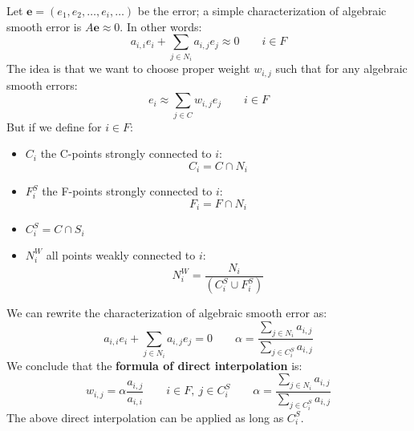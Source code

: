 Let $\mathbf{e} = \left( e_{1}, e_{2}, \dots, e_{i}, \dots \right)$ be the error; a simple characterization of algebraic smooth error is $A\mathbf{e} \approx 0$. In other words:
\begin{equation}
	a_{i,i} e_{i} + \displaystyle\sum_{j \in N_{i}} a_{i,j}e_{j} \approx 0 \hspace{2em} i \in F
\end{equation}
The idea is that we want to choose proper weight $w_{i,j}$ such that for any algebraic smooth errors:
\begin{equation*}
	e_{i} \approx \displaystyle\sum_{j \in C} w_{i,j}e_{j} \hspace{2em} i \in F
\end{equation*}
But if we define for $i \in F$:
\begin{itemize}
	\item $C_{i}$ the C-points strongly connected to $i$:
	\begin{equation*}
		C_{i} = C \cap N_{i}
	\end{equation*}
	
	\item $F_{i}^{S}$ the F-points strongly connected to $i$:
	\begin{equation*}
		F_{i} = F \cap N_{i}
	\end{equation*}
	
	\item $C_{i}^{S} = C \cap S_{i}$
	
	\item $N_{i}^{W}$ all points weakly connected to $i$:
	\begin{equation*}
		N_{i}^{W} = \dfrac{N_{i}}{\left(C_{i}^{S} \cup F_{i}^{S}\right)}
	\end{equation*}
\end{itemize}
We can rewrite the characterization of algebraic smooth error as:
\begin{equation}
	a_{i,i} e_{i} + \displaystyle\sum_{j \in N_{i}} a_{i,j}e_{j} = 0 \hspace{2em} \alpha = \dfrac{
		\displaystyle\sum_{j \in N_{i}} a_{i,j}
	}{
		\displaystyle\sum_{j \in C_{i}^{S}} a_{i,j}
	}
\end{equation}
We conclude that the \textbf{formula of direct interpolation} is:
\begin{equation}
	w_{i,j} = \alpha\dfrac{a_{i,j}}{a_{i,i}} \hspace{2em} i \in F, \: j \in C_{i}^{S} \hspace{2em} \alpha = \dfrac{
		\displaystyle\sum_{j \in N_{i}} a_{i,j}
	}{
		\displaystyle\sum_{j \in C_{i}^{S}} a_{i,j}
	}
\end{equation}
The above direct interpolation can be applied as long as $C_{i}^{S}$.

